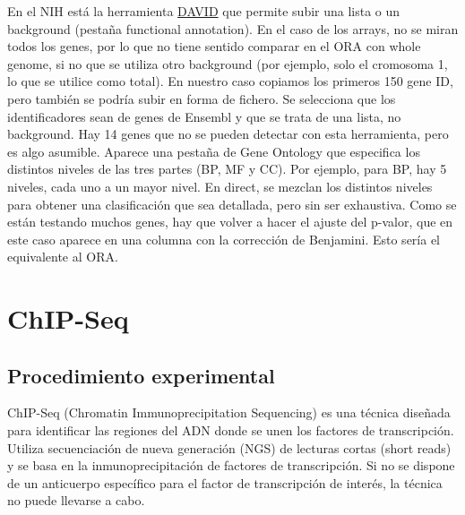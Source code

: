 En el NIH está la herramienta \href{https://davidbioinformatics.nih.gov/}{DAVID} que permite subir una lista o un background (pestaña functional annotation). En el caso de los arrays, no se miran todos los genes, por lo que no tiene sentido comparar en el ORA con whole genome, si no que se utiliza otro background (por ejemplo, solo el cromosoma 1, lo que se utilice como total). En nuestro caso copiamos los primeros 150 gene ID, pero también se podría subir en forma de fichero. Se selecciona que los identificadores sean de genes de Ensembl y que se trata de una lista, no background. Hay 14 genes que no se pueden detectar con esta herramienta, pero es algo asumible. Aparece una pestaña de Gene Ontology que especifica los distintos niveles de las tres partes (BP, MF y CC). Por ejemplo, para BP, hay 5 niveles, cada uno a un mayor nivel. En direct, se mezclan los distintos niveles para obtener una clasificación que sea detallada, pero sin ser exhaustiva. Como se están testando muchos genes, hay que volver a hacer el ajuste del p-valor, que en este caso aparece en una columna con la corrección de Benjamini. Esto sería el equivalente al ORA.

\chapter{ChIP-Seq}
\section{Procedimiento experimental}
ChIP-Seq (Chromatin Immunoprecipitation Sequencing) es una técnica diseñada para identificar las regiones del ADN donde se unen los factores de transcripción. Utiliza secuenciación de nueva generación (NGS) de lecturas cortas (short reads) y se basa en la inmunoprecipitación de factores de transcripción. Si no se dispone de un anticuerpo específico para el factor de transcripción de interés, la técnica no puede llevarse a cabo.

